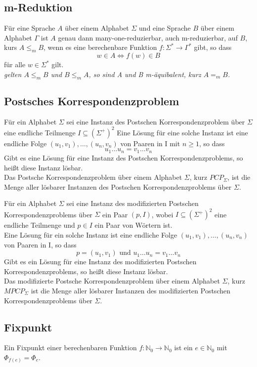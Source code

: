 \subsection{m-Reduktion}
    Für eine Sprache \(A\) über einem Alphabet \(\Sigma\) und eine Sprache \(B\) über einem Alphabet \(\Gamma\)
    ist \(A\) genau dann many-one-reduzierbar, auch m-reduzierbar, auf \(B\), kurs \(A\leq_m B\), wenn es eine berechenbare Funktion 
    \(f:\Sigma^*\to\Gamma^*\) gibt, so dass
    \[w\in A\Leftrightarrow f(w)\in B\]
    für alle \(w\in\Sigma^*\) gilt.\\
    \textit{gelten \(A\leq_m B\) und \(B\leq_m A\), so sind A und B m-äquibalent, kurz \(A=_m B\).}
\subsection{Postsches Korrespondenzproblem}
    Für ein Alphabet \(\Sigma\) sei eine Instanz des Postschen Korrespondenzproblem über \(\Sigma\)
    eine endliche Teilmenge \(I\subseteq(\Sigma^+)^2\) Eine Lösung für eine solche Instanz ist eine 
    endliche Folge \((u_1,v_1),\dots,(u_n,v_n)\) von Paaren in I mit \(n\geq1\), so dass 
    \[u_1\dots u_n=v_1\dots v_n\]
    Gibt es eine Lösung für eine Instanz des Postschen Korrespondenzproblems, so heißt diese Instanz lösbar.\\
    Das Postsche Korrespondenzproblem über einem Alphabet \(\Sigma\), kurz \(PCP_\Sigma\), ist die Menge 
    aller lösbarer Instanzen des Postschen Korrespondenzproblems über \(\Sigma\).\par\bigskip
    Für ein Alphabet \(\Sigma\) sei eine Instanz des modifizierten Postschen Korrespondenzproblems über \(\Sigma\)
    ein Paar \((p,I)\), wobei \(I\subseteq(\Sigma^+)^2\) eine endliche Teilmenge und \(p\in I\) ein Paar von Wörtern ist.\\
    Eine Lösung für ein solche Instanz ist eine endliche Folge \((u_1,v_1),\dots,(u_n,v_n)\) von Paaren in I, so dass 
    \[p=(u_1,v_1)\text{ und }u_1\dots u_n=v_1\dots v_n\]
    Gibt es ein Lösung für eine Instanz des modifizierten Postschen Korrespondenzproblems, so heißt diese Instanz lösbar.\\
    Das modifizierte Postsche Korrespondenzproblem über einem Alphabet \(\Sigma\), kurz \(MPCP_\Sigma\) ist die Menge aller 
    lösbarer Instanzen des modifizierten Postschen Korrespondenzproblems über \(\Sigma\).
\subsection{Fixpunkt}
    Ein Fixpunkt einer berechenbaren Funktion \(f:\mathbb{N}_0\to \mathbb{N}_0\) ist ein \(e\in\mathbb{N}_0\) mit 
    \(\Phi_{f(e)}=\Phi_e\).
